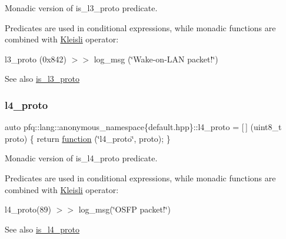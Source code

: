 Monadic version of {\ttfamily is\+\_\+l3\+\_\+proto} predicate. 

Predicates are used in conditional expressions, while monadic functions are combined with \hyperlink{structpfq_1_1lang_1_1Kleisli}{Kleisli} operator\+:

l3\+\_\+proto (0x842) $>$$>$ log\+\_\+msg (\char`\"{}\+Wake-\/on-\/\+L\+A\+N packet!\char`\"{})

\begin{DoxySeeAlso}{See also}
\hyperlink{namespacepfq_1_1lang_1_1anonymous__namespace_02default_8hpp_03_a814bb9c3c833dc2af342d695b1d503e8}{is\+\_\+l3\+\_\+proto} 
\end{DoxySeeAlso}
\mbox{\label{namespacepfq_1_1lang_1_1anonymous__namespace_02default_8hpp_03_a8ad2208c91dc3cd4378e715aab5fb4b7}} 
\subsubsection{\texorpdfstring{l4\+\_\+proto}{l4\_proto}}
{\footnotesize\ttfamily auto pfq\+::lang\+::anonymous\+\_\+namespace\{default.\+hpp\}\+::l4\+\_\+proto = \mbox{[}$\,$\mbox{]} (uint8\+\_\+t proto) \{ return \hyperlink{namespacepfq_1_1lang_a1a4638059d700ae08d0ca63886ff2bb3}{function} (\char`\"{}l4\+\_\+proto\char`\"{}, proto); \}}



Monadic version of {\ttfamily is\+\_\+l4\+\_\+proto} predicate. 

Predicates are used in conditional expressions, while monadic functions are combined with \hyperlink{structpfq_1_1lang_1_1Kleisli}{Kleisli} operator\+:

l4\+\_\+proto(89) $>$$>$ log\+\_\+msg(\char`\"{}\+O\+S\+F\+P packet!\char`\"{})

\begin{DoxySeeAlso}{See also}
\hyperlink{namespacepfq_1_1lang_1_1anonymous__namespace_02default_8hpp_03_a9d06d4dedca1ebdc3b270cb2f3e9e42b}{is\+\_\+l4\+\_\+proto} 
\end{DoxySeeAlso}
\mbox{\label{namespacepfq_1_1lang_1_1anonymous__namespace_02default_8hpp_03_aaad98f847b8e4c53a5ddec3c93b05296}} 
